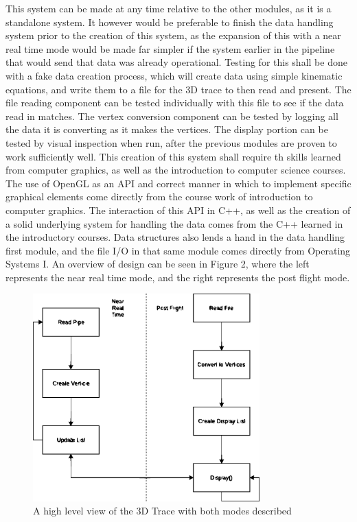 \documentclass[onecolumn, draftclsnofoot,10pt, compsoc]{IEEEtran}
\begin{document}
This system can be made at any time relative to the other modules, as it is a standalone system. It however would be preferable to finish the data handling system prior to the creation of this system, as the expansion of this with a near real time mode would be made far simpler if the system earlier in the pipeline that would send that data was already operational. Testing for this shall be done with a fake data creation process, which will create data using simple kinematic equations, and write them to a file for the 3D trace to then read and present. The file reading component can be tested individually with this file to see if the data read in matches. The vertex conversion component can be tested by logging all the data it is converting as it makes the vertices. The display portion can be tested by visual inspection when run, after the previous modules are proven to work sufficiently well. 
This creation of this system shall require th skills learned from computer graphics, as well as the introduction to computer science courses. The use of OpenGL as an API and correct manner in which to implement specific graphical elements come directly from the course work of introduction to computer graphics. The interaction of this API in C++, as well as the creation of a solid underlying system for handling the data comes from the C++ learned in the introductory courses. Data structures also lends a hand in the data handling first module, and the file I/O in that same module comes directly from Operating Systems I. 
An overview of design can be seen in Figure 2, where the left represents the near real time mode, and the right represents the post flight mode. 
\begin{figure}[h]
    \centering
        \includegraphics[height=8cm]{3DTrace}
        \caption{A high level view of the 3D Trace with both modes described}
        \label{fig:handel}
\end{figure}
\end{document}
